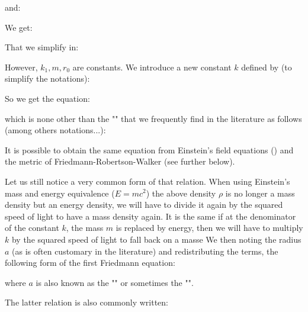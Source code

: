 	and:
	
	We get:
	
	That we simplify in:
	
	However, $k_1,m,r_0$ are constants. We introduce a new constant $k$ defined by (to simplify the notations):
	
	So we get the equation:
	
	which is none other than the "" that we frequently find in the literature as follows (among others notations...):
	
	It is possible to obtain the same equation from Einstein's field equations () and the metric of Friedmann-Robertson-Walker (see further below).
	
	Let us still notice a very common form of that relation. When using Einstein's mass and energy equivalence ($E=mc^2$) the above density $\rho$ is no longer a mass density but an energy density, we will have to divide it again by the squared speed of light to have a mass density again. It is the same if at the denominator of the constant $k$, the mass $m$ is replaced by energy, then we will have to multiply $k$ by the squared speed of light to fall back on a masse We then noting the radius $a$ (as is often customary in the literature) and redistributing the terms, the following form of the first Friedmann equation:
	
	where $a$ is also known as the "" or sometimes the "".
	
	The latter relation is also commonly written:
	
